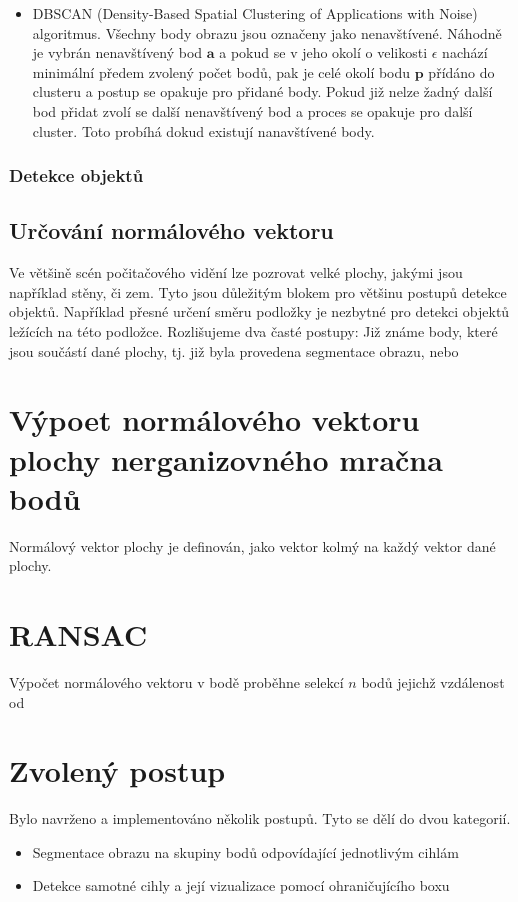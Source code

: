 \documentclass[twoside]{ctuthesis}
\newcommand{\tl}[1]{$\mathbf{#1}$}
\begin{document}
\begin{itemize}
\begin{itemize}
        \item DBSCAN (Density-Based Spatial Clustering of Applications with Noise) algoritmus. Všechny body obrazu jsou označeny jako nenavštívené. Náhodně je vybrán nenavštívený bod \tl{a} a pokud se v jeho okolí o velikosti $\epsilon$ nachází minimální předem zvolený počet bodů, pak je celé okolí bodu \tl{p} přídáno do clusteru a postup se opakuje pro přidané body. Pokud již nelze žadný další bod přidat zvolí se další nenavštívený bod a proces se opakuje pro další cluster. Toto probíhá dokud existují nanavštívené body. 
    \end{itemize}
\end{itemize}

\subsubsection{Detekce objektů}


\subsection{Určování normálového vektoru}
Ve většině scén počitačového vidění lze pozrovat velké plochy, jakými jsou například stěny, či zem. Tyto jsou důležitým blokem pro většinu postupů detekce objektů. Například přesné určení směru podložky je nezbytné pro detekci objektů ležících na této podložce. Rozlišujeme dva časté postupy: Již známe body, které jsou součástí dané plochy, tj. již byla provedena segmentace obrazu, nebo 

\section{Výpoet normálového vektoru plochy nerganizovného mračna bodů} 
Normálový vektor plochy je definován, jako vektor kolmý na každý vektor dané plochy. 
\section{RANSAC}
    Výpočet normálového vektoru v bodě proběhne selekcí $n$ bodů jejichž vzdálenost od 

\section{Zvolený postup}
Bylo navrženo a implementováno několik postupů. Tyto se dělí do dvou kategorií.
\begin{itemize}
    \item Segmentace obrazu na skupiny bodů odpovídající jednotlivým cihlám
    \item Detekce samotné cihly a její vizualizace pomocí ohraničujícího boxu
\end{itemize}
\end{document}
